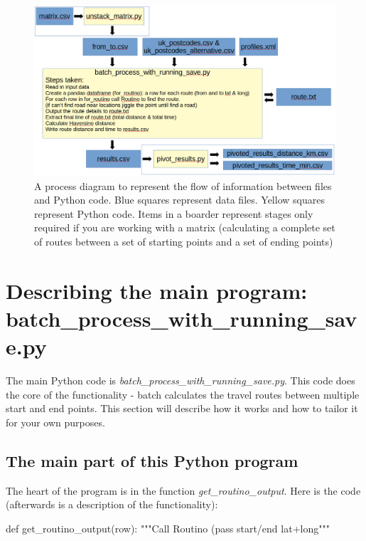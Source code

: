 \documentclass{article}
\begin{document}
\begin{flushleft}
\begin{figure}[!h]
	\centering
	\includegraphics[width=1\textwidth]{images/process_diagram_1.png}
	\caption{A process diagram to represent the flow of information between files and Python code. Blue squares represent data files. Yellow squares represent Python code. Items in a boarder represent stages only required if you are working with a matrix (calculating a complete set of routes between a set of starting points and a set of ending points)}
	\label{fig:process_diagram}
\end{figure}


\newpage

\section{Describing the main program: batch\_process\_with\_running\_save.py}

The main Python code is \textit{batch\_process\_with\_running\_save.py}. This code does the core of the functionality - batch calculates the travel routes between multiple start and end points. This section will describe how it works and how to tailor it for your own purposes.

\subsection{The main part of this Python program}

The heart of the program is in the function \textit{get\_routino\_output}.
Here is the code (afterwards is a description of the functionality):

\newpage


\begin{python}
def get_routino_output(row):
  """Call Routino (pass start/end lat+long"""


\end{python}
\end{flushleft}
\end{document}
